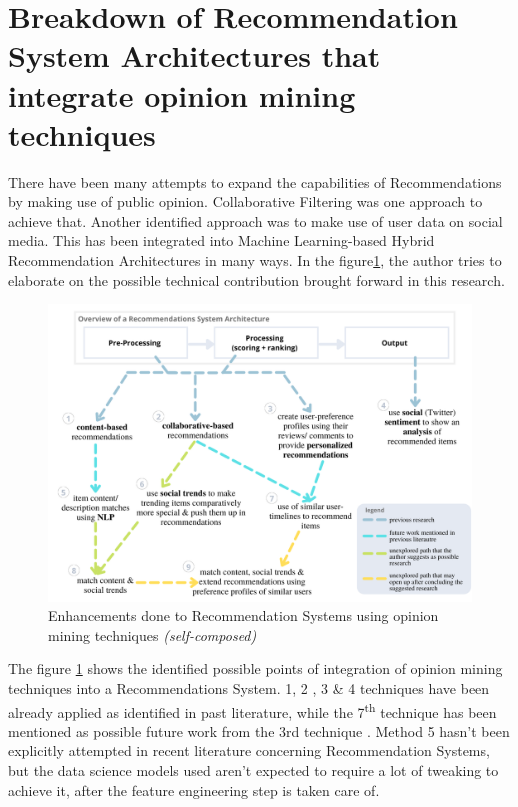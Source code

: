 \documentclass[manuscript,screen,review]{acmart}
\begin{document}




\section{Breakdown of Recommendation System Architectures that integrate opinion mining techniques}
There have been many attempts to expand the capabilities of Recommendations by making use of public opinion. Collaborative Filtering was one approach to achieve that. Another identified approach was to make use of user data on social media. This has been integrated into Machine Learning-based Hybrid Recommendation Architectures in many ways. In the figure\ref{fig:recommendation-opinion-mining-enhancements}, the author tries to elaborate on the possible technical contribution brought forward in this research.

\begin{figure}[h]
\centering
\includegraphics[width=\textwidth]{images/Enhanced_Recommendation_Systems.png}
\caption{Enhancements done to Recommendation Systems using opinion mining techniques \textit{(self-composed)}}
\label{fig:recommendation-opinion-mining-enhancements}
\end{figure}

The figure \ref{fig:recommendation-opinion-mining-enhancements} shows the identified possible points of integration of opinion mining techniques into a Recommendations System.
1, 2 \cite{linden_amazoncom_2003, larry_history_2019}, 3 \cite{cheng_hybrid_2020} \& 4 \cite{ayushi_cross-domain_2018} techniques have been already applied as identified in past literature, while the 7\textsuperscript{th} technique has been mentioned as possible future work from the 3rd technique \cite{chen_user_2019}. Method 5 hasn't been explicitly attempted in recent literature concerning Recommendation Systems, but the data science models used aren't expected to require a lot of tweaking to achieve it, after the feature engineering step is taken care of.
\end{document}
